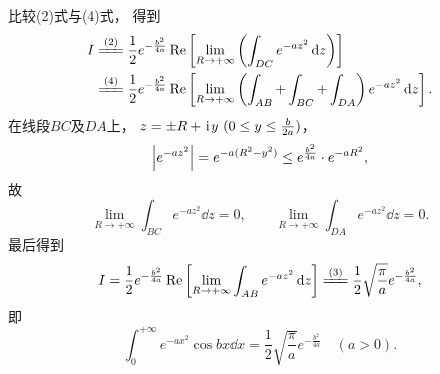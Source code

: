 \begin{example}
\begin{solution}
比较(2)式与(4)式，
得到\begin{align*}
	I &\xlongequal{\rm(2)}
		\frac{1}{2} e^{-\frac{b^2}{4a}}
		\Re\left[
			\lim_{R\to+\infty}
			\left( \int_{DC} e^{-az^2} \dd{z} \right)
		\right] \\
	&\xlongequal{\rm(4)}
		\frac{1}{2} e^{-\frac{b^2}{4a}}
		\Re\left[
			\lim_{R\to+\infty}
			\left( \int_{AB} + \int_{BC} + \int_{DA}\right)
			e^{-az^2} \dd{z}
		\right].
\end{align*}
在线段\(BC\)及\(DA\)上，
\(z=\pm R+\kern1pt\mathrm{i}\kern1pt y\ (0 \leq y \leq \frac{b}{2a})\)，
\begin{equation*}
	\abs{e^{-az^2}}
	= e^{-a(R^2-y^2)}
	\leq e^{\frac{b^2}{4a}} \cdot e^{-aR^2},
\end{equation*}
故\begin{equation*}
	\lim_{R\to+\infty} \int_{BC} e^{-az^2} \dd{z} = 0,
	\qquad
	\lim_{R\to+\infty} \int_{DA} e^{-az^2} \dd{z} = 0.
\end{equation*}
最后得到\begin{equation*}
	I = \frac{1}{2} e^{-\frac{b^2}{4a}} \Re\left[ \lim_{R\to+\infty} \int_{AB} e^{-az^2} \dd{z} \right]
	\xlongequal{\rm(3)} \frac{1}{2} \sqrt{\frac{\pi}{a}} e^{-\frac{b^2}{4a}},
\end{equation*}
即\begin{equation}\label{equation:留数定理.泊松积分}
	\int_0^{+\infty} e^{-ax^2} \cos bx \dd{x}
	= \frac{1}{2} \sqrt{\frac{\pi}{a}} e^{-\frac{b^2}{4a}}
	\quad(a>0).
\end{equation}
\end{solution}
\end{example}

